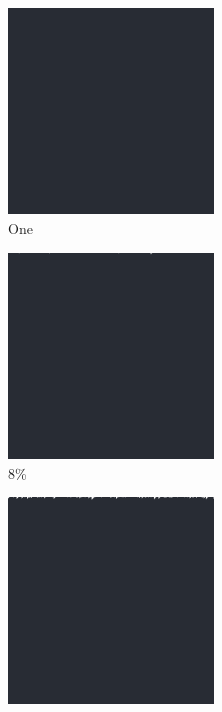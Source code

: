 \documentclass[12pt, fleqn]{report}                             %
\theoremstyle{break}                                            %
\begin{document}
      \begin{figure}[ht!]
        \centering
        \begin{subfigure}[b]{0.4\linewidth}
          \includegraphics[width=0.6\textwidth]{Images/136/a.png}
          \caption{One}
        \end{subfigure}
        \begin{subfigure}[b]{0.4\linewidth}
          \includegraphics[width=0.6\textwidth]{Images/136/b.png}
          \caption{8\%}
        \end{subfigure}
        \begin{subfigure}[b]{0.4\linewidth}
          \includegraphics[width=0.6\textwidth]{Images/136/c.png}

\end{subfigure}
\end{figure}
\end{document}
